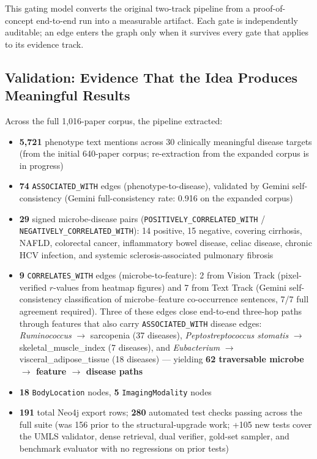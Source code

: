 \documentclass[12pt, letterpaper]{article}
\begin{document}
This gating model converts the original two-track pipeline from a proof-of-concept end-to-end run into a measurable artifact. Each gate is independently auditable; an edge enters the graph only when it survives every gate that applies to its evidence track.

\subsection{Validation: Evidence That the Idea Produces Meaningful Results}

Across the full 1,016-paper corpus, the pipeline extracted:

\begin{itemize}
    \item \textbf{5,721} phenotype text mentions across 30 clinically meaningful disease targets (from the initial 640-paper corpus; re-extraction from the expanded corpus is in progress)
    \item \textbf{74} \texttt{ASSOCIATED\_WITH} edges (phenotype-to-disease), validated by Gemini self-consistency (Gemini full-consistency rate: 0.916 on the expanded corpus)
    \item \textbf{29} signed microbe-disease pairs (\texttt{POSITIVELY\_CORRELATED\_WITH} / \texttt{NEGATIVELY\_CORRELATED\_WITH}): 14 positive, 15 negative, covering cirrhosis, NAFLD, colorectal cancer, inflammatory bowel disease, celiac disease, chronic HCV infection, and systemic sclerosis-associated pulmonary fibrosis
    \item \textbf{9} \texttt{CORRELATES\_WITH} edges (microbe-to-feature): 2 from Vision Track (pixel-verified $r$-values from heatmap figures) and 7 from Text Track (Gemini self-consistency classification of microbe--feature co-occurrence sentences, 7/7 full agreement required). Three of these edges close end-to-end three-hop paths through features that also carry \texttt{ASSOCIATED\_WITH} disease edges: \textit{Ruminococcus} $\to$ sarcopenia (37 diseases), \textit{Peptostreptococcus stomatis} $\to$ skeletal\_muscle\_index (7 diseases), and \textit{Eubacterium} $\to$ visceral\_adipose\_tissue (18 diseases) --- yielding \textbf{62 traversable microbe $\to$ feature $\to$ disease paths}
    \item \textbf{18} \texttt{BodyLocation} nodes, \textbf{5} \texttt{ImagingModality} nodes
    \item \textbf{191} total Neo4j export rows; \textbf{280} automated test checks passing across the full suite (was 156 prior to the structural-upgrade work; +105 new tests cover the UMLS validator, dense retrieval, dual verifier, gold-set sampler, and benchmark evaluator with no regressions on prior tests)
\end{itemize}
\end{document}
